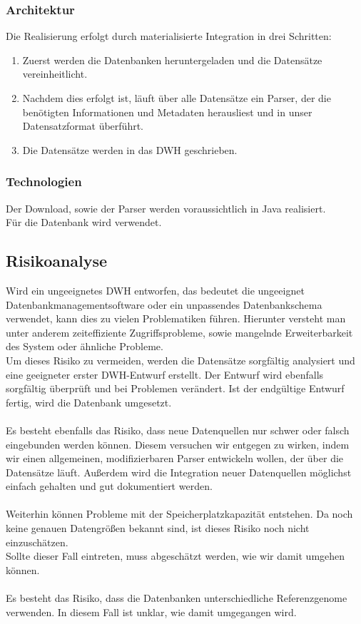 \documentclass{scrartcl}
\begin{document}
\subsubsection{Architektur}
Die Realisierung erfolgt durch materialisierte Integration in drei Schritten:
\begin{enumerate}
\item Zuerst werden die Datenbanken heruntergeladen und die Datensätze vereinheitlicht.
\item Nachdem dies erfolgt ist, läuft über alle Datensätze ein Parser, der die benötigten Informationen und Metadaten herausliest und in unser Datensatzformat überführt.
\item Die Datensätze werden in das DWH geschrieben.
\end{enumerate}
\subsubsection{Technologien}
Der Download, sowie der Parser werden voraussichtlich in Java realisiert.\\
Für die Datenbank wird verwendet.
\subsection{Risikoanalyse}
Wird ein ungeeignetes DWH entworfen, das bedeutet die ungeeignet Datenbankmanagementsoftware oder ein unpassendes Datenbankschema verwendet, kann dies zu vielen Problematiken führen. Hierunter versteht man unter anderem zeiteffiziente Zugriffsprobleme, sowie mangelnde Erweiterbarkeit des System oder ähnliche Probleme.\\
Um dieses Risiko zu vermeiden, werden die Datensätze sorgfältig analysiert und eine geeigneter erster DWH-Entwurf erstellt. Der Entwurf wird ebenfalls sorgfältig überprüft und bei Problemen verändert. Ist der endgültige Entwurf fertig, wird die Datenbank umgesetzt.\\\\
Es besteht ebenfalls das Risiko, dass neue Datenquellen nur schwer oder falsch eingebunden werden können. Diesem versuchen wir entgegen zu wirken, indem wir einen allgemeinen, modifizierbaren Parser entwickeln wollen, der über die Datensätze läuft. Außerdem wird die Integration neuer Datenquellen möglichst einfach gehalten und gut dokumentiert werden.\\\\
Weiterhin können Probleme mit der Speicherplatzkapazität entstehen. Da noch keine genauen Datengrößen bekannt sind, ist dieses Risiko noch nicht einzuschätzen.\\
Sollte dieser Fall eintreten, muss abgeschätzt werden, wie wir damit umgehen können.
\\\\
Es besteht das Risiko, dass die Datenbanken unterschiedliche Referenzgenome verwenden. In diesem Fall ist unklar, wie damit umgegangen wird.
\end{document}
